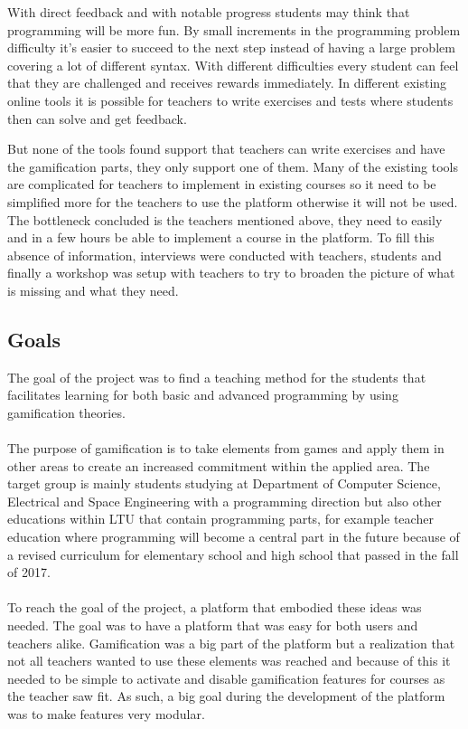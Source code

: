 \documentclass[a4paper,12pt]{article}
\begin{document}
With direct feedback and with notable progress students may think that programming will be more fun. By small increments in the programming problem difficulty it's easier to succeed to the next step instead of having a large problem covering a lot of different syntax. With different difficulties every student can feel that they are challenged and receives rewards immediately. In different existing online tools it is possible for teachers to write exercises and tests where students then can solve and get feedback. 

But none of the tools found support that teachers can write exercises and have the gamification parts, they only support one of them. Many of the existing tools are complicated for teachers to implement in existing courses so it need to be simplified more for the teachers to use the platform otherwise it will not be used. The bottleneck concluded is the teachers mentioned above, they need to easily and in a few hours be able to implement a course in the platform. To fill this absence of information, interviews were conducted with teachers, students and finally a workshop was setup with teachers to try to broaden the picture of what is missing and what they need.


\subsection{Goals}   
The goal of the project was to find a teaching method for the students that facilitates learning for both basic and advanced programming by using gamification theories.
\\ \\
The purpose of gamification is to take elements from games and apply them in other areas to create an increased commitment within the applied area.
The target group is mainly students studying at Department of Computer Science, Electrical and Space Engineering  with a programming direction but also other educations within LTU that contain programming parts, for example teacher education where programming will become a central part in the future because of a revised curriculum for elementary school and high school that passed in the fall of 2017.
\\ \\
To reach the goal of the project, a platform that embodied these ideas was needed.
The goal was to have a platform that was easy for both users and teachers alike. Gamification was a big part of the platform but a realization that not all teachers wanted to use these elements was reached and because of this it needed to be simple to activate and disable gamification features for courses as the teacher saw fit. As such, a big goal during the development of the platform was to make features very modular.
\end{document}
